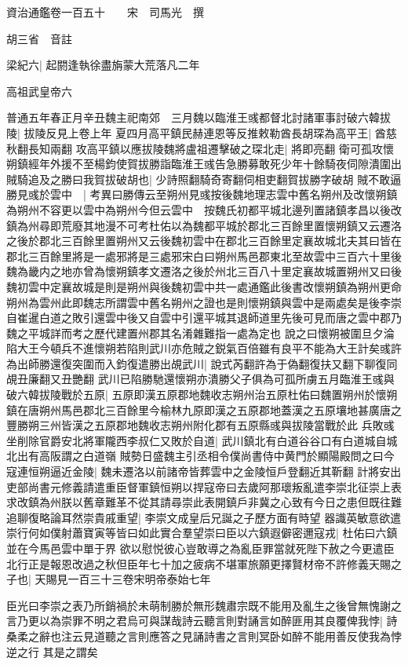 資治通鑑卷一百五十　　宋　司馬光　撰

胡三省　音註

梁紀六|{
	起閼逢執徐盡旃蒙大荒落凡二年}


高祖武皇帝六

普通五年春正月辛丑魏主祀南郊　三月魏以臨淮王彧都督北討諸軍事討破六韓拔陵|{
	拔陵反見上卷上年}
夏四月高平鎮民赫連恩等反推敕勒酋長胡琛為高平王|{
	酋慈秋翻長知兩翻}
攻高平鎮以應拔陵魏將盧祖遷擊破之琛北走|{
	將即亮翻}
衛可孤攻懷朔鎮經年外援不至楊鈞使賀拔勝詣臨淮王彧告急勝募敢死少年十餘騎夜伺隙潰圍出賊騎追及之勝曰我賀拔破胡也|{
	少詩照翻騎奇寄翻伺相吏翻賀拔勝字破胡}
賊不敢逼勝見彧於雲中　|{
	考異曰勝傳云至朔州見彧按後魏地理志雲中舊名朔州及改懷朔鎮為朔州不容更以雲中為朔州今但云雲中　按魏氏初都平城北邊列置諸鎮孝昌以後改鎮為州尋即荒廢其地漫不可考杜佑以為魏都平城於郡北三百餘里置懷朔鎮又云遷洛之後於郡北三百餘里置朔州又云後魏初雲中在郡北三百餘里定襄故城北夫其曰皆在郡北三百餘里將是一處邪將是三處邪宋白曰朔州馬邑郡東北至故雲中三百六十里後魏為畿内之地亦曾為懷朔鎮孝文遷洛之後於州北三百八十里定襄故城置朔州又曰後魏初雲中定襄故城是則是朔州與後魏初雲中共一處通鑑此後書改懷朔鎮為朔州更命朔州為雲州此即魏志所謂雲中舊名朔州之證也是則懷朔鎮與雲中是兩處矣是後李崇自崔暹白道之敗引還雲中後又自雲中引還平城其退師道里先後可見而唐之雲中郡乃魏之平城詳而考之歷代建置州郡其名淆雜難指一處為定也}
說之曰懷朔被圍旦夕淪陷大王今頓兵不進懷朔若陷則武川亦危賊之鋭氣百倍雖有良平不能為大王計矣彧許為出師勝還復突圍而入鈞復遣勝出覘武川|{
	說式芮翻許為于偽翻復扶又翻下聊復同覘丑廉翻又丑艷翻}
武川已陷勝馳還懷朔亦潰勝父子俱為可孤所虜五月臨淮王彧與破六韓拔陵戰於五原|{
	五原即漢五原郡地魏收志朔州治五原杜佑曰魏置朔州於懷朔鎮在唐朔州馬邑郡北三百餘里今榆林九原即漢之五原郡地蓋漢之五原壤地甚廣唐之豐勝朔三州皆漢之五原郡地魏收志朔州附化郡有五原縣彧與拔陵當戰於此}
兵敗彧坐削除官爵安北將軍隴西李叔仁又敗於自道|{
	武川鎮北有白道谷谷口有白道城自城北出有高阪謂之白道嶺}
賊勢日盛魏主引丞相令僕尚書侍中黄門於顯陽殿問之曰今寇連恒朔逼近金陵|{
	魏未遷洛以前諸帝皆葬雲中之金陵恒戶登翻近其靳翻}
計將安出吏部尚書元修義請遣重臣督軍鎮恒朔以捍寇帝曰去歲阿那瓌叛亂遣李崇北征崇上表求改鎮為州朕以舊章難革不從其請尋崇此表開鎮戶非冀之心致有今日之患但既往難追聊復略論耳然崇貴戚重望|{
	李崇文成皇后兄誕之子歷方面有時望}
器識英敏意欲遣崇行何如僕射蕭寶寅等皆曰如此實合羣望崇曰臣以六鎮遐僻密邇寇戎|{
	杜佑曰六鎮並在今馬邑雲中單于界}
欲以慰悦彼心豈敢導之為亂臣罪當就死陛下赦之今更遣臣北行正是報恩改過之秋但臣年七十加之疲病不堪軍旅願更擇賢材帝不許修義天賜之子也|{
	天賜見一百三十三卷宋明帝泰始七年}


臣光曰李崇之表乃所銷禍於未萌制勝於無形魏肅宗既不能用及亂生之後曾無愧謝之言乃更以為崇罪不明之君烏可與謀哉詩云聽言則對誦言如醉匪用其良覆俾我悖|{
	詩桑柔之辭也注云見道聽之言則應答之見誦詩書之言則冥卧如醉不能用善反使我為悖逆之行}
其是之謂矣

